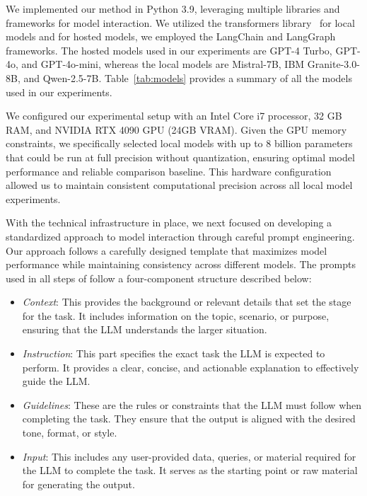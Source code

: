 We implemented our method \methodName in Python 3.9, leveraging multiple libraries and frameworks for model interaction. We utilized the transformers library~\cite{transformers} for local models and for hosted models, we employed the LangChain and LangGraph frameworks.  The hosted models used in our experiments are GPT-4 Turbo, GPT-4o, and GPT-4o-mini, whereas  the local models are Mistral-7B, IBM Granite-3.0-8B, and Qwen-2.5-7B. Table~\ref{tab:models} provides a summary of all the models used in our experiments.

We configured our experimental setup with an Intel Core i7 processor, 32 GB RAM, and NVIDIA RTX 4090 GPU (24GB VRAM). Given the GPU memory constraints, we specifically selected local models with up to 8 billion parameters that could be run at full precision without quantization, ensuring optimal model performance and reliable comparison baseline. This hardware configuration allowed us to maintain consistent computational precision across all local model experiments.

With the technical infrastructure in place, we next focused on developing a standardized approach to model interaction through careful prompt engineering. Our approach follows a carefully designed template that maximizes model performance while maintaining consistency across different models. The prompts used in all steps of \methodName follow a four-component structure described below:

\begin{itemize}[nosep,leftmargin=*]
	\item \textit{Context}: This provides the background or relevant details that set the stage for the task. It includes information on the topic, scenario, or purpose, ensuring that the LLM understands the larger situation.
	\item \textit{Instruction}: This part specifies the exact task the LLM is expected to perform. It provides a clear, concise, and actionable explanation to effectively guide the LLM.
	\item \textit{Guidelines}: These are the rules or constraints that the LLM must follow when completing the task. They ensure that the output is aligned with the desired tone, format, or style.
	\item \textit{Input}: This includes any user-provided data, queries, or material required for the LLM to complete the task. It serves as the starting point or raw material for generating the output.
\end{itemize}

